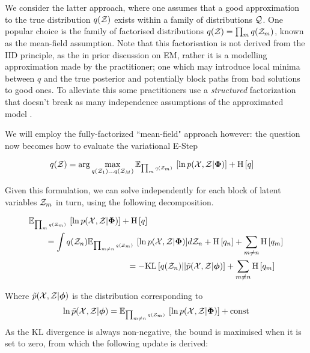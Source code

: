 We consider the latter approach, where one assumes that a good approximation to the true distribution $q({ \mathcal{Z} })$ exists within a family of distributions ${ \mathcal{Q} }$. One popular choice is the family of factorised distributions $q({ \mathcal{Z} }) = \prod_m q({ \mathcal{Z} }_m)$, known as the mean-field assumption\cite{Neal1998}. Note that this factorisation is not derived from the IID principle, as the in prior discussion on EM, rather it is a modelling approximation made by the practitioner; one which may introduce local minima between $q$ and the true posterior and potentially block paths from bad solutions to good ones\cite{WainwrightJordan2008}. To alleviate this some practitioners use a \emph{structured} factorization that doesn't break as many independence assumptions of the approximated model \cite{Hoffman2015}\cite{Opper2009}\cite{SaulJordan1996}.

We will employ the fully-factorized ``mean-field" approach however: the question now becomes how to evaluate the variational E-Step


\begin{align}
q({ \mathcal{Z} }) & = \arg \max_{q({ \mathcal{Z} }_1) \ldots q({ \mathcal{Z} }_M)} { \mathbb{E}_{ { {{ \mbox{\tiny ${\prod_m q({ \mathcal{Z} }_m)}$ } }} } }\left[ { \ln { p( { \mathcal{X} } ,  { \mathcal{Z} } |  {  \bm \Phi  } ) } } \right] } + \text{H} \left[ q \right]
\end{align}

Given this formulation, we can solve independently for each block of latent variables ${ \mathcal{Z} }_m$ in turn, using the following decomposition.

\begin{align}
\begin{split}
& \mathbb{E}_{{ \mbox{\tiny ${\prod_m q({ \mathcal{Z} }_m)}$ } }} \left[ { \ln { p( { \mathcal{X} } ,  { \mathcal{Z} } |  {  \bm \Phi  } ) } } \right] + \text{H} \left[ q \right] \\
& \qquad = \int q({ \mathcal{Z} }_n) { \mathbb{E}_{ { {{ \mbox{\tiny ${\prod_{m\neq n} q({ \mathcal{Z} }_m)}$ } }} } }\left[ { \ln { p( { \mathcal{X} } ,  { \mathcal{Z} } |  {  \bm \Phi  } ) } } \right] } d{ \mathcal{Z} }_n + \text{H} \left[ q_n \right] + \sum_{m\neq n} \text{H} \left[ q_m \right]
\end{split}\\
\begin{split}
& \qquad = -\text{KL}\left[q({ \mathcal{Z} }_n)||\tilde{p}({ \mathcal{X} }, { \mathcal{Z} }|{ \bm \phi })\right] + \sum_{m\neq n} \text{H} \left[ q_m \right] 
\end{split}
\end{align}

Where $\tilde{p}({ \mathcal{X} }, { \mathcal{Z} }|{ \bm \phi })$ is the distribution corresponding to
\begin{align}
\ln \tilde{p}({ \mathcal{X} }, { \mathcal{Z} }|{ \bm \phi }) = \mathbb{E}_{ { { \mbox{\tiny ${\prod_{m\neq n} q({ \mathcal{Z} }_m)}$ } } } }\left[ { \ln { p( { \mathcal{X} } ,  { \mathcal{Z} } |  {  \bm \Phi  } ) } } \right] + \text{const}
\end{align}
As the KL divergence is always non-negative, the bound is maximised when it is set to zero, from which the following update is derived: 

